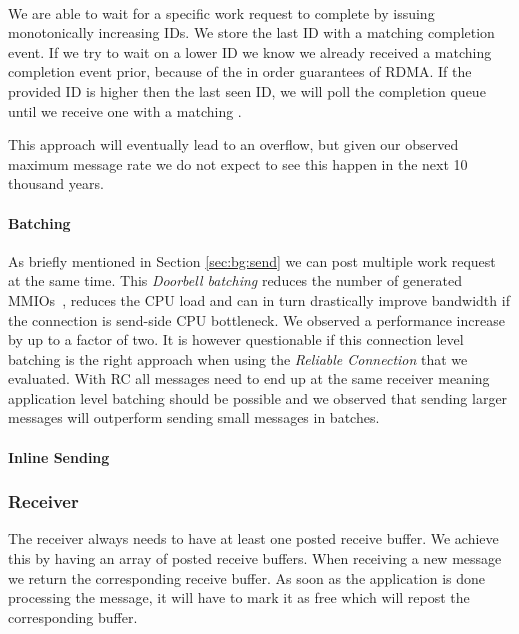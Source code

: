 \paragraph{} We are able to wait for a specific work request to complete by issuing monotonically increasing IDs. We store the
last ID with a matching completion event. If we try to wait on a lower ID we know we already received a matching completion 
event prior, because of the in order guarantees of RDMA. If the provided ID is higher then the
last seen ID, we will poll the completion queue until we receive one with a matching .

This approach will eventually lead to an overflow, but given our observed maximum message rate we do not expect to see this 
happen in the next 10 thousand years.


\paragraph{Batching} As briefly mentioned in Section \ref{sec:bg:send} we can post multiple work request at the same time. 
This \emph{Doorbell batching} reduces the number of generated MMIOs~\cite{anuj-guide}, reduces the CPU load and can in turn 
drastically improve bandwidth if the connection is send-side CPU bottleneck. We observed a performance increase by up to 
a factor of two. It is however questionable if this connection level batching is the right approach when using the 
\emph{Reliable Connection} that we evaluated. With RC all messages need to end up at the same receiver meaning application 
level batching should be possible and we observed that sending larger messages will outperform sending small messages in 
batches.

\paragraph{Inline Sending} 

\subsubsection{Receiver}

The receiver always needs to have at least one posted receive buffer. We achieve this by having an array of posted receive 
buffers. When receiving a new message we return the corresponding receive buffer. As soon as the application is done processing
the message, it will have to mark it as free which will repost the corresponding buffer.

